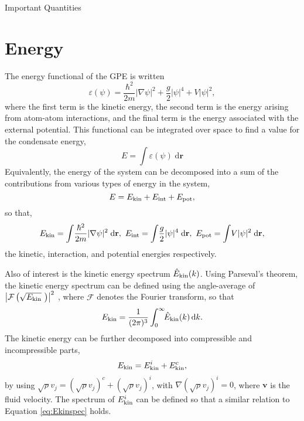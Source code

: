 \begin{chapter}{Important Quantities\label{app:ImpQuantities}}
\section{\label{appsection:energy} Energy}
The energy functional of the GPE is written
\begin{equation}
\varepsilon(\psi) = \frac{\hbar^2}{2m}|\nabla\psi|^2 + \frac{g}{2}|\psi|^4 + V|\psi|^2,
\label{eq:Efn}
\end{equation}
where the first term is the kinetic energy, the second term is the energy arising from atom-atom interactions, and the final term is the energy associated with the external potential. This functional can be integrated over space to find a value for the condensate energy,
\begin{equation}
E = \int\!\varepsilon(\psi)\;\mathrm{d}\mathbf{r}
\label{eq:Efn}
\end{equation}
Equivalently, the energy of the system can be decomposed into a sum of the contributions from various types of energy in the system,
\begin{equation*}
E = E_{\rm kin} + E_{\rm int} + E_{\mathrm{pot}},
\label{eq:Esplit}
\end{equation*}
so that,
\begin{equation}
E_{\rm kin} = \int\!\frac{\hbar^2}{2m}|\nabla\psi|^2\;\mathrm{d}\mathbf{r},~E_{\rm int}=\int\!\frac{g}{2}|\psi|^4\;\mathrm{d}\mathbf{r},~E_{\mathrm{pot}}=\int\!V|\psi|^2\;\mathrm{d}\mathbf{r},
\label{eq:Esplitdef}
\end{equation}
the kinetic, interaction, and potential energies respectively.

Also of interest is the kinetic energy spectrum $\hat{E}_{\rm kin}(k)$. Using Parseval's theorem, the kinetic energy spectrum can be defined using the angle-average of $\left | \mathcal{F} \left (\sqrt{E_{\rm kin}}\ \right )\right |^2$ \cite{Nore}, where $\mathcal{F}$ denotes the Fourier transform, so that
\begin{equation}
E_{\rm kin} = \frac{1}{(2\pi)^3}\int^\infty_0\!\!\hat{E}_{\rm kin}(k)\,\mathrm{d}k.
\label{eq:Ekinspec}
\end{equation}
The kinetic energy can be further decomposed into compressible and incompressible parts,
\begin{equation*}
E_{\rm kin} = E^i_{\rm kin} + E^c_{\rm kin},
\label{eq:Esplitdef}
\end{equation*}
by using $\sqrt{\rho}v_j = (\sqrt{\rho}v_j)^c + (\sqrt{\rho}v_j)^i$, with $\nabla(\sqrt{\rho}v_j)^i=0$, where $\mathbf{v}$ is the fluid velocity. The spectrum of $E^i_{\rm kin}$ can be defined so that a similar relation to Equation \ref{eq:Ekinspec} holds.



\end{chapter}
